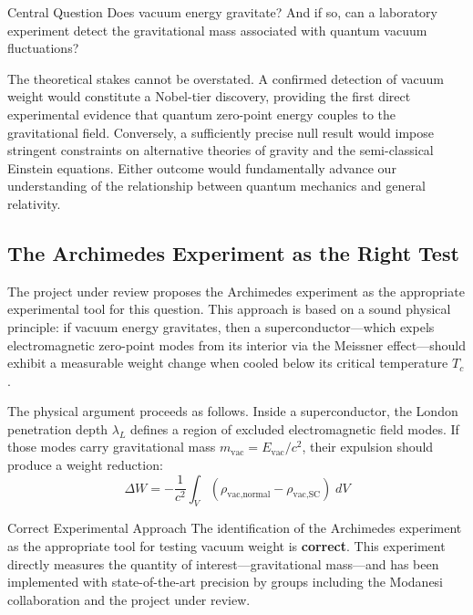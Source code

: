 \documentclass[11pt,a4paper]{article}
\begin{document}
\begin{infobox}{Central Question}
Does vacuum energy gravitate? And if so, can a laboratory experiment detect the gravitational mass associated with quantum vacuum fluctuations?
\end{infobox}

The theoretical stakes cannot be overstated. A confirmed detection of vacuum weight would constitute a Nobel-tier discovery, providing the first direct experimental evidence that quantum zero-point energy couples to the gravitational field. Conversely, a sufficiently precise null result would impose stringent constraints on alternative theories of gravity and the semi-classical Einstein equations. Either outcome would fundamentally advance our understanding of the relationship between quantum mechanics and general relativity.

\subsection{The Archimedes Experiment as the Right Test}

The project under review proposes the Archimedes experiment as the appropriate experimental tool for this question. This approach is based on a sound physical principle: if vacuum energy gravitates, then a superconductor---which expels electromagnetic zero-point modes from its interior via the Meissner effect---should exhibit a measurable weight change when cooled below its critical temperature $T_c$.

The physical argument proceeds as follows. Inside a superconductor, the London penetration depth $\lambda_L$ defines a region of excluded electromagnetic field modes. If those modes carry gravitational mass $m_{\text{vac}} = E_{\text{vac}}/c^2$, their expulsion should produce a weight reduction:
\begin{equation}
  \Delta W = -\frac{1}{c^2}\int_V (\rho_{\text{vac,normal}} - \rho_{\text{vac,SC}})\; dV
  \label{eq:weight-change}
\end{equation}

\begin{okbox}{Correct Experimental Approach}
The identification of the Archimedes experiment as the appropriate tool for testing vacuum weight is \textbf{correct}. This experiment directly measures the quantity of interest---gravitational mass---and has been implemented with state-of-the-art precision by groups including the Modanesi collaboration and the project under review.
\end{okbox}
\end{document}
